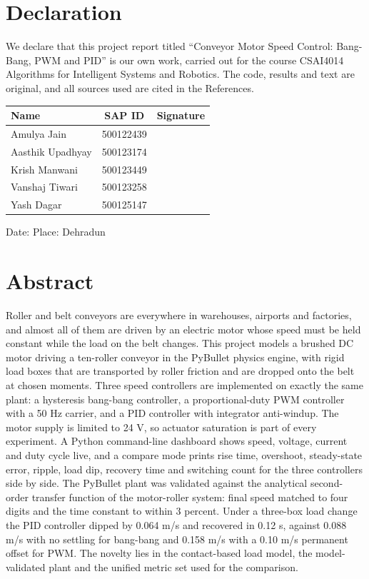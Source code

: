 \documentclass[12pt,a4paper]{article}
\newcommand{\projtitle}{Conveyor Motor Speed Control: Bang-Bang, PWM and PID}
\begin{document}
\section*{Declaration}
We declare that this project report titled ``\projtitle'' is our own work, carried out for the course CSAI4014 Algorithms for Intelligent Systems and Robotics. The code, results and text are original, and all sources used are cited in the References.

\vspace{0.8cm}
\begin{center}
\begin{tabular}{|l|c|p{4cm}|}
\hline
\textbf{Name} & \textbf{SAP ID} & \textbf{Signature} \\ \hline
Amulya Jain & 500122439 & \\[0.5cm] \hline
Aasthik Upadhyay & 500123174 & \\[0.5cm] \hline
Krish Manwani & 500123449 & \\[0.5cm] \hline
Vanshaj Tiwari & 500123258 & \\[0.5cm] \hline
Yash Dagar & 500125147 & \\[0.5cm] \hline
\end{tabular}
\end{center}

\vspace{0.8cm}
Date: \underline{\hspace{4cm}} \hfill Place: Dehradun
\clearpage

\section*{Abstract}
Roller and belt conveyors are everywhere in warehouses, airports and factories, and almost all of them are driven by an electric motor whose speed must be held constant while the load on the belt changes. This project models a brushed DC motor driving a ten-roller conveyor in the PyBullet physics engine, with rigid load boxes that are transported by roller friction and are dropped onto the belt at chosen moments. Three speed controllers are implemented on exactly the same plant: a hysteresis bang-bang controller, a proportional-duty PWM controller with a 50 Hz carrier, and a PID controller with integrator anti-windup. The motor supply is limited to 24 V, so actuator saturation is part of every experiment. A Python command-line dashboard shows speed, voltage, current and duty cycle live, and a compare mode prints rise time, overshoot, steady-state error, ripple, load dip, recovery time and switching count for the three controllers side by side. The PyBullet plant was validated against the analytical second-order transfer function of the motor-roller system: final speed matched to four digits and the time constant to within 3 percent. Under a three-box load change the PID controller dipped by 0.064 m/s and recovered in 0.12 s, against 0.088 m/s with no settling for bang-bang and 0.158 m/s with a 0.10 m/s permanent offset for PWM. The novelty lies in the contact-based load model, the model-validated plant and the unified metric set used for the comparison.
\end{document}
